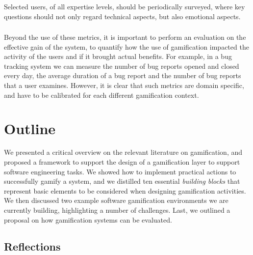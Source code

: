 Selected users, of all expertise levels, should be periodically surveyed, where key questions should not only regard technical aspects, but also emotional aspects.


\subsubsection{}

Beyond the use of these metrics, it is important to perform an evaluation on the effective gain of the system, to quantify how the use of gamification impacted the activity of the users and if it brought actual benefits.
For example, in a bug tracking system we can measure the number of bug reports opened and closed every day, the average duration of a bug report and the number of bug reports that a user examines.
However, it is clear that such metrics are domain specific, and have to be calibrated for each different gamification context.


\section{Outline}\label{sec:gamification-summary}

We presented a critical overview on the relevant literature on gamification, and proposed a framework to support the design of a gamification layer to support software engineering tasks.
We showed how to implement practical actions to successfully gamify a system, and we distilled ten essential \emph{building blocks} that represent basic elements to be considered when designing gamification activities.
We then discussed two example software gamification environments we are currently building, highlighting a number of challenges.
Last, we outlined a proposal on how gamification systems can be evaluated.

\subsection{Reflections}

